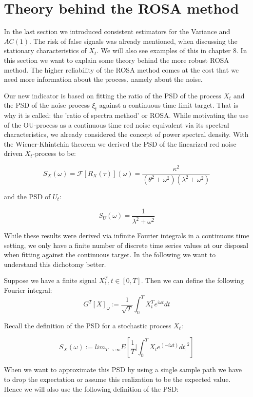 \documentclass[%
thesis=student,%
coverpage=false,%
titlepage=false,%
headmarks=true, %
english,%
font=libertine, %
math=newpxtx, %
BCOR=5mm,%
coverBCOR=11mm%
]{tumbook}
\begin{document}
\chapter{Theory behind the ROSA method}

In the last section we introduced consistent estimators for the Variance and $AC(1)$. The risk of false signals was already mentioned, when discussing the stationary characteristics of $X_{t}$. We will also see examples of this in chapter 8. In this section we want to explain some theory behind the more robust ROSA method. The higher reliability of the ROSA method comes at the cost that we need more information about the process, namely about the noise. 

Our new indicator is based on fitting the ratio of the PSD of the process $X_{t}$ and the PSD of the noise process $\xi_{t}$ against a continuous time limit target. That is why it is called: the 'ratio of spectra method' or ROSA. While motivating the use of the OU-process as a continuous time red noise equivalent via its spectral characteristics, we already considered the concept of power spectral density. With the Wiener-Khintchin theorem we derived the PSD of the linearized red noise driven $X_{t}$-process to be:

\[
S_{X}(\omega) = \mathcal{F}[R_{X}(\tau)](\omega) = \frac{\kappa^{2}}{(\theta^{2} + \omega^{2})(\lambda^{2} + \omega^{2})}
\]

and the PSD of $U_{t}$:

\[
S_{U}(\omega) = \frac{1}{\lambda^2 + \omega^2}
\]

While these results were derived via infinite Fourier integrals in a continuous time setting, we only have a finite number of discrete time series values at our disposal when fitting against the continuous target. In the following we want to understand this dichotomy better.

Suppose we have a finite signal $X_{t}^{T}, t \in [0,T]$. Then we can define the following Fourier integral: 
\[
    G^{T}[X]_{\omega} := \frac{1}{\sqrt{T}}\int_{0}^{T}X_{t}^{T}e^{i \omega t}dt
\]

Recall the definition of the PSD for a stochastic process $X_{t}$:

\[
S_{X}(\omega) := lim_{T\rightarrow\infty}E[\frac{1}{T}\lvert\int_{0}^{T}X_{t}e^{(-i\omega t)}dt \rvert^{2}]
\]

When we want to approximate this PSD by using a single sample path we have to drop the expectation or assume this realization to be the expected value. Hence we will also use the following definition of the PSD:
\end{document}
